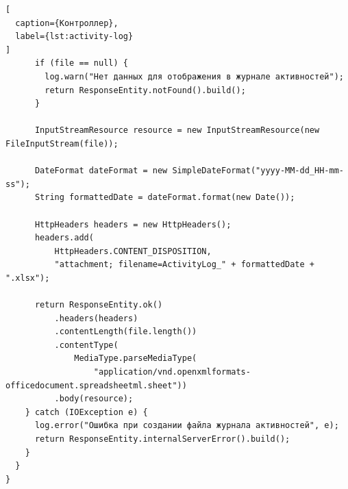 \begin{lstlisting}[
  caption={Контроллер},
  label={lst:activity-log}
]
      if (file == null) {
        log.warn("Нет данных для отображения в журнале активностей");
        return ResponseEntity.notFound().build();
      }

      InputStreamResource resource = new InputStreamResource(new FileInputStream(file));

      DateFormat dateFormat = new SimpleDateFormat("yyyy-MM-dd_HH-mm-ss");
      String formattedDate = dateFormat.format(new Date());

      HttpHeaders headers = new HttpHeaders();
      headers.add(
          HttpHeaders.CONTENT_DISPOSITION,
          "attachment; filename=ActivityLog_" + formattedDate + ".xlsx");

      return ResponseEntity.ok()
          .headers(headers)
          .contentLength(file.length())
          .contentType(
              MediaType.parseMediaType(
                  "application/vnd.openxmlformats-officedocument.spreadsheetml.sheet"))
          .body(resource);
    } catch (IOException e) {
      log.error("Ошибка при создании файла журнала активностей", e);
      return ResponseEntity.internalServerError().build();
    }
  }
}
\end{lstlisting}


